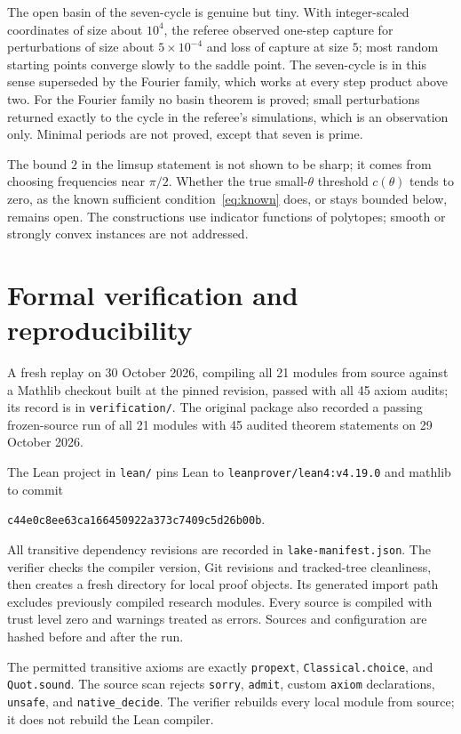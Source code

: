 \documentclass[11pt]{article}
\theoremstyle{remark}\newtheorem{remark}[theorem]{Remark}
\newcommand{\replaystatus}{A fresh replay on 30 October 2026, compiling all 21 modules from source against a Mathlib checkout built at the pinned revision, passed with all 45 axiom audits; its record is in \texttt{verification/}.}
\begin{document}
The open basin of the seven-cycle is genuine but tiny. With integer-scaled coordinates of size about $10^4$, the referee observed one-step capture for perturbations of size about $5\times10^{-4}$ and loss of capture at size $5$; most random starting points converge slowly to the saddle point. The seven-cycle is in this sense superseded by the Fourier family, which works at every step product above two. For the Fourier family no basin theorem is proved; small perturbations returned exactly to the cycle in the referee's simulations, which is an observation only. Minimal periods are not proved, except that seven is prime.

The bound $2$ in the limsup statement is not shown to be sharp; it comes from choosing frequencies near $\pi/2$. Whether the true small-$\theta$ threshold $c(\theta)$ tends to zero, as the known sufficient condition~\eqref{eq:known} does, or stays bounded below, remains open. The constructions use indicator functions of polytopes; smooth or strongly convex instances are not addressed.

\section{Formal verification and reproducibility}\label{sec:verification}

\replaystatus{} The original package also recorded a passing frozen-source run of all 21 modules with 45 audited theorem statements on 29 October 2026.

The Lean project in \texttt{lean/} pins Lean to \texttt{leanprover/lean4:v4.19.0} and mathlib to commit
\begin{center}\small\texttt{c44e0c8ee63ca166450922a373c7409c5d26b00b}.\end{center}
All transitive dependency revisions are recorded in \texttt{lake-manifest.json}. The verifier checks the compiler version, Git revisions and tracked-tree cleanliness, then creates a fresh directory for local proof objects. Its generated import path excludes previously compiled research modules. Every source is compiled with trust level zero and warnings treated as errors. Sources and configuration are hashed before and after the run.

The permitted transitive axioms are exactly \texttt{propext}, \texttt{Classical.choice}, and \texttt{Quot.sound}. The source scan rejects \texttt{sorry}, \texttt{admit}, custom \texttt{axiom} declarations, \texttt{unsafe}, and \texttt{native\_decide}. The verifier rebuilds every local module from source; it does not rebuild the Lean compiler.
\end{document}
